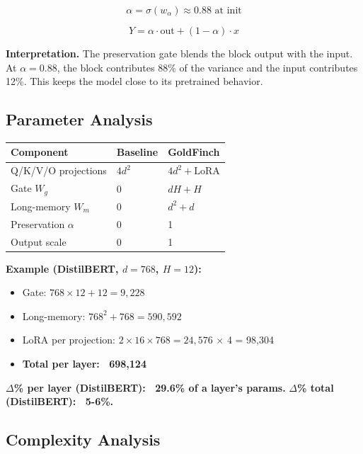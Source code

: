 \[
\alpha = \sigma(w_\alpha) \approx 0.88 \text{ at init}
\tag{4.10}
\]

\[
Y = \alpha \cdot \text{out} + (1 - \alpha) \cdot x
\tag{4.11}
\]

\textbf{Interpretation.} The preservation gate blends the block output with the 
input. At $\alpha = 0.88$, the block contributes 88\% of the variance and 
the input contributes 12\%. This keeps the model close to its pretrained 
behavior.

\subsection{Parameter Analysis}

\begin{table}[H]
\centering
\small
\begin{tabular}{lll}
\toprule
\textbf{Component} & \textbf{Baseline} & \textbf{GoldFinch} \\
\midrule
Q/K/V/O projections & $4 d^2$ & $4 d^2 + \text{LoRA}$ \\
Gate $W_g$ & 0 & $d H + H$ \\
Long-memory $W_m$ & 0 & $d^2 + d$ \\
Preservation $\alpha$ & 0 & 1 \\
Output scale & 0 & 1 \\
\bottomrule
\end{tabular}
\end{table}

\textbf{Example (DistilBERT, $d = 768$, $H = 12$):}
\begin{itemize}
\item Gate: $768 \times 12 + 12 = 9{,}228$
\item Long-memory: $768^2 + 768 = 590{,}592$
\item LoRA per projection: $2 \times 16 \times 768 = 24{,}576$ $\times$ 4 = 98,304
\item \textbf{Total per layer: ~698,124}

\end{itemize}
\textbf{$\Delta$\% per layer (DistilBERT): ~29.6\% of a layer's params.}
\textbf{$\Delta$\% total (DistilBERT): ~5-6\%.}

\subsection{Complexity Analysis}

